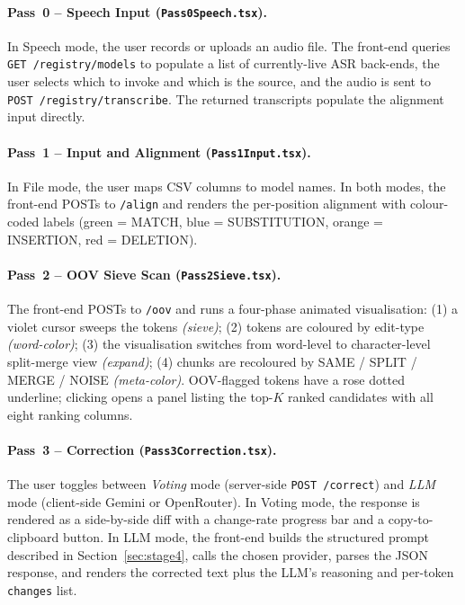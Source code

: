 \paragraph{Pass~0 -- Speech Input (\texttt{Pass0Speech.tsx}).}
In Speech mode, the user records or uploads an audio file. The front-end queries \texttt{GET /registry/models} to populate a list of currently-live ASR back-ends, the user selects which to invoke and which is the source, and the audio is sent to \texttt{POST /registry/transcribe}. The returned transcripts populate the alignment input directly.

\paragraph{Pass~1 -- Input and Alignment (\texttt{Pass1Input.tsx}).}
In File mode, the user maps CSV columns to model names. In both modes, the front-end POSTs to \texttt{/align} and renders the per-position alignment with colour-coded labels (green = MATCH, blue = SUBSTITUTION, orange = INSERTION, red = DELETION).

\paragraph{Pass~2 -- OOV Sieve Scan (\texttt{Pass2Sieve.tsx}).}
The front-end POSTs to \texttt{/oov} and runs a four-phase animated visualisation: (1) a violet cursor sweeps the tokens \emph{(sieve)}; (2) tokens are coloured by edit-type \emph{(word-color)}; (3) the visualisation switches from word-level to character-level split-merge view \emph{(expand)}; (4) chunks are recoloured by SAME / SPLIT / MERGE / NOISE \emph{(meta-color)}. OOV-flagged tokens have a rose dotted underline; clicking opens a panel listing the top-$K$ ranked candidates with all eight ranking columns.

\paragraph{Pass~3 -- Correction (\texttt{Pass3Correction.tsx}).}
The user toggles between \emph{Voting} mode (server-side \texttt{POST /correct}) and \emph{LLM} mode (client-side Gemini or OpenRouter). In Voting mode, the response is rendered as a side-by-side diff with a change-rate progress bar and a copy-to-clipboard button. In LLM mode, the front-end builds the structured prompt described in Section~\ref{sec:stage4}, calls the chosen provider, parses the JSON response, and renders the corrected text plus the LLM's reasoning and per-token \texttt{changes} list.

